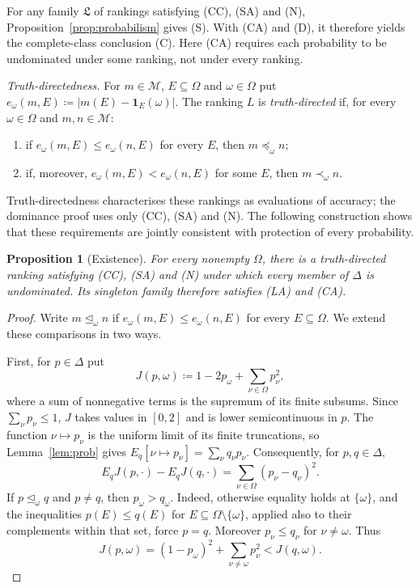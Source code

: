 \documentclass[11pt]{article}
\newenvironment{chgblockb}{\color{red}}{}
\newtheorem{proposition}[theorem]{Proposition}
\theoremstyle{definition}
\theoremstyle{remark}
\newcommand{\M}{\mathcal M}
\newcommand{\Lf}{\mathfrak L}
\begin{document}
\begin{chgblockb}
For any family $\Lf$ of rankings satisfying (CC), (SA) and (N), Proposition~\ref{prop:probabilism} gives (S). With (CA) and (D), it therefore yields the complete-class conclusion (C). Here (CA) requires each probability to be undominated under some ranking, not under every ranking.

\emph{Truth-directedness.} For $m\in\M$, $E\subseteq\Omega$ and $\omega\in\Omega$ put $e_\omega(m,E)\coloneqq|m(E)-\mathbf 1_E(\omega)|$. The ranking $L$ is \emph{truth-directed} if, for every $\omega\in\Omega$ and $m,n\in\M$:
\begin{enumerate}[label=(TD\arabic*),leftmargin=3em]
\item\label{TD1} if $e_\omega(m,E)\le e_\omega(n,E)$ for every $E$, then $m\preceq_\omega n$;
\item\label{TD2} if, moreover, $e_\omega(m,E)<e_\omega(n,E)$ for some $E$, then $m\prec_\omega n$.
\end{enumerate}
Truth-directedness characterises these rankings as evaluations of accuracy; the dominance proof uses only (CC), (SA) and (N). The following construction shows that these requirements are jointly consistent with protection of every probability.

\begin{proposition}[Existence]\label{prop:accuracy-existence}
For every nonempty $\Omega$, there is a truth-directed ranking satisfying (CC), (SA) and (N) under which every member of $\Delta$ is undominated. Its singleton family therefore satisfies (LA) and (CA).
\end{proposition}
\begin{proof}
Write $m\unlhd_\omega n$ if $e_\omega(m,E)\le e_\omega(n,E)$ for every $E\subseteq\Omega$. We extend these comparisons in two ways.

First, for $p\in\Delta$ put
\[
J(p,\omega)\coloneqq 1-2p_\omega+\sum_{\nu\in\Omega}p_\nu^2,
\]
where a sum of nonnegative terms is the supremum of its finite subsums. Since $\sum_\nu p_\nu\le1$, $J$ takes values in $[0,2]$ and is lower semicontinuous in $p$. The function $\nu\mapsto p_\nu$ is the uniform limit of its finite truncations, so Lemma~\ref{lem:prob} gives $E_q[\nu\mapsto p_\nu]=\sum_\nu q_\nu p_\nu$. Consequently, for $p,q\in\Delta$,
\begin{equation}\label{eq:atomic-brier}
E_qJ(p,\cdot)-E_qJ(q,\cdot)
=\sum_{\nu\in\Omega}(p_\nu-q_\nu)^2.
\end{equation}
If $p\unlhd_\omega q$ and $p\ne q$, then $p_\omega>q_\omega$. Indeed, otherwise equality holds at $\{\omega\}$, and the inequalities $p(E)\le q(E)$ for $E\subseteq\Omega\setminus\{\omega\}$, applied also to their complements within that set, force $p=q$. Moreover $p_\nu\le q_\nu$ for $\nu\ne\omega$. Thus
\[
J(p,\omega)=(1-p_\omega)^2+\sum_{\nu\ne\omega}p_\nu^2
<J(q,\omega).
\]


\end{proof}
\end{chgblockb}
\end{document}
